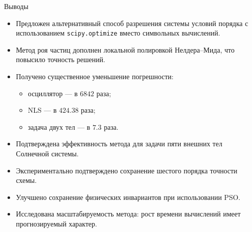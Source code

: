 \begin{frame}{Выводы}
	
	\scriptsize
	
	\begin{itemize}
		
		\item Предложен альтернативный способ разрешения
		системы условий порядка с использованием
		\texttt{scipy.optimize}
		вместо символьных вычислений.
		
		\vspace{0.15cm}
		
		\item Метод роя частиц дополнен локальной
		полировкой Нелдера--Мида,
		что повысило точность решений.
		
		\vspace{0.15cm}
		
		\item Получено существенное уменьшение погрешности:
		\begin{itemize}
			\item осциллятор --- в $6842$ раза;
			\item NLS --- в $424.38$ раза;
			\item задача двух тел --- в $7.3$ раза.
		\end{itemize}
		
		\vspace{0.15cm}
		
		\item Подтверждена эффективность метода
		для задачи пяти внешних тел
		Солнечной системы.
		
		\vspace{0.15cm}
		
		\item Экспериментально подтверждено сохранение
		шестого порядка точности схемы.
		
		\vspace{0.15cm}
		
		\item Улучшено сохранение физических инвариантов
		при использовании PSO.
		
		\vspace{0.15cm}
		
		\item Исследована масштабируемость метода:
		рост времени вычислений имеет
		прогнозируемый характер.
		
	\end{itemize}
	
\end{frame}